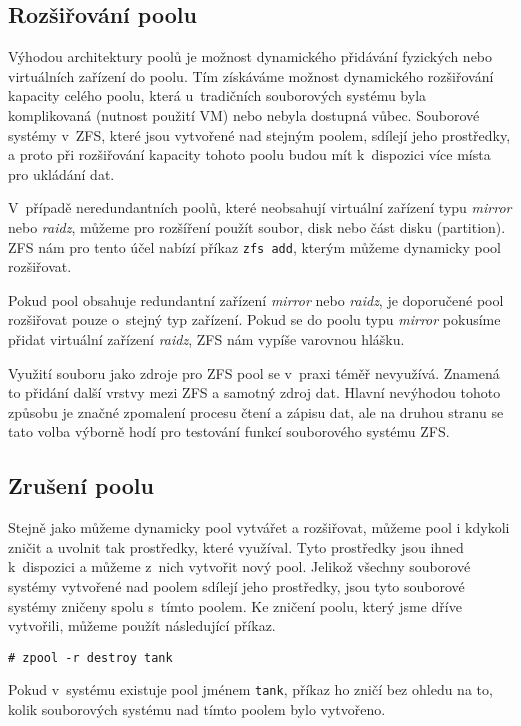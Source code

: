 \subsection{Rozšiřování poolu}
Výhodou architektury poolů je možnost dynamického přidávání fyzických nebo virtuálních zařízení do poolu. Tím získáváme možnost dynamického rozšiřování kapacity celého poolu, která u~tradičních souborových systému byla komplikovaná (nutnost použití VM) nebo nebyla dostupná vůbec. Souborové systémy v~ZFS, které jsou vytvořené nad stejným poolem, sdílejí jeho prostředky, a proto při rozšiřování kapacity tohoto poolu budou mít k~dispozici více místa pro ukládání dat.

V~případě neredundantních poolů, které neobsahují virtuální zařízení typu \emph{mirror} nebo \emph{raidz}, můžeme pro rozšíření použít soubor, disk nebo část disku (partition). ZFS nám pro tento účel nabízí příkaz \verb|zfs add|, kterým můžeme dynamicky pool rozšiřovat.

Pokud pool obsahuje redundantní zařízení \emph{mirror} nebo \emph{raidz}, je doporučené pool rozšiřovat pouze o~stejný typ zařízení. Pokud se do poolu typu \emph{mirror} pokusíme přidat virtuální zařízení \emph{raidz}, ZFS nám vypíše varovnou hlášku.

Využití souboru jako zdroje pro ZFS pool se v~praxi téměř nevyužívá. Znamená to přidání další vrstvy mezi ZFS a samotný zdroj dat. Hlavní nevýhodou tohoto způsobu je značné zpomalení procesu čtení a zápisu dat, ale na druhou stranu se tato volba výborně hodí pro testování funkcí souborového systému ZFS.

\subsection{Zrušení poolu}
Stejně jako můžeme dynamicky pool vytvářet a rozšiřovat, můžeme pool i kdykoli zničit a uvolnit tak prostředky, které využíval. Tyto prostředky jsou ihned k~dispozici a můžeme z~nich vytvořit nový pool. Jelikož všechny souborové systémy vytvořené nad poolem sdílejí jeho prostředky, jsou tyto souborové systémy zničeny spolu s~tímto poolem. Ke zničení poolu, který jsme dříve vytvořili, můžeme použít následující příkaz.
\begin{verbatim}
# zpool -r destroy tank
\end{verbatim}
Pokud v~systému existuje pool jménem \verb|tank|, příkaz ho zničí bez ohledu na to, kolik souborových systému nad tímto poolem bylo vytvořeno.

